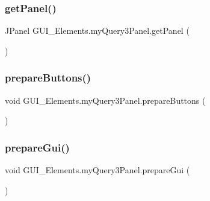 \hypertarget{class_g_u_i___elements_1_1my_query3_panel_ad792ef80368c829d32e9329a2ba7bb17}{}\label{class_g_u_i___elements_1_1my_query3_panel_ad792ef80368c829d32e9329a2ba7bb17} 
\subsubsection{\texorpdfstring{get\+Panel()}{getPanel()}}
{\footnotesize\ttfamily J\+Panel G\+U\+I\+\_\+\+Elements.\+my\+Query3\+Panel.\+get\+Panel (\begin{DoxyParamCaption}{ }\end{DoxyParamCaption})}

\hypertarget{class_g_u_i___elements_1_1my_query3_panel_a51ae30aafd90618c99d3b6b67734ddd3}{}\label{class_g_u_i___elements_1_1my_query3_panel_a51ae30aafd90618c99d3b6b67734ddd3} 
\subsubsection{\texorpdfstring{prepare\+Buttons()}{prepareButtons()}}
{\footnotesize\ttfamily void G\+U\+I\+\_\+\+Elements.\+my\+Query3\+Panel.\+prepare\+Buttons (\begin{DoxyParamCaption}{ }\end{DoxyParamCaption})}

\hypertarget{class_g_u_i___elements_1_1my_query3_panel_a0edd26c1cd0bd4b5621508c32b89d362}{}\label{class_g_u_i___elements_1_1my_query3_panel_a0edd26c1cd0bd4b5621508c32b89d362} 
\subsubsection{\texorpdfstring{prepare\+Gui()}{prepareGui()}}
{\footnotesize\ttfamily void G\+U\+I\+\_\+\+Elements.\+my\+Query3\+Panel.\+prepare\+Gui (\begin{DoxyParamCaption}{ }\end{DoxyParamCaption})}

